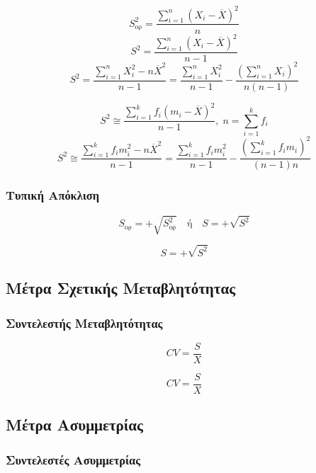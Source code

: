 \begin{multicols}{2}
  \[
S_{\text{ορ}}^2=\frac{\sum_{i=1}^{n}(X_{i}-\overline{X})^{2}}{n}
  \]
  \[
S^{2}=\frac{\sum_{i=1}^{n}(X_{i}-\overline{X})^{2}}{n-1}
  \]
  \[
S^{2}=\frac{\sum_{i=1}^{n}X_{i}^{2}-n\overline{X}^{2}}{n-1}=\frac{\sum_{i=1}^{n}X_{i}^{2}}{n-1}-\frac{(\sum_{i=1}^{n}X_{i})^{2}}{n(n-1)}
  \]

  \columnbreak

\[
S^{2}\cong \frac{\sum_{i=1}^{k}f_{i}(m_{i}-\overline{X})^{2}}{n-1},\; n=\sum_{i=1}^{k}f_{i}
\]
\[
S^{2}\cong \frac{\sum_{i=1}^{k}f_{i}m_{i}^{2}-n\overline{X}^{2}}{n-1}=\frac{\sum_{i=1}^{k}f_{i}m_{i}^{2}}{n-1}-\frac{(\sum_{i=1}^{k}f_{i}m_{i})^{2}}{(n-1)n}
\]

\end{multicols}

\subsubsection{Τυπική Απόκλιση}

\begin{multicols}{2}
  \[
S_{\text{ορ}}=+\sqrt{S_{\text{ορ}}^{2}} \quad\text{ή}\quad S=+\sqrt{S^{2}}
  \]

  \[
S=+\sqrt{S^{2}}
  \]

\end{multicols}

\subsection{Μέτρα Σχετικής Μεταβλητότητας}


\subsubsection{Συντελεστής Μεταβλητότητας}

\begin{multicols}{2}

  \[
CV=\frac{S}{X}
  \]

  \[
CV=\frac{S}{X}
  \]

\end{multicols}

\subsection{Μέτρα Ασυμμετρίας}

\subsubsection{Συντελεστές Ασυμμετρίας}

